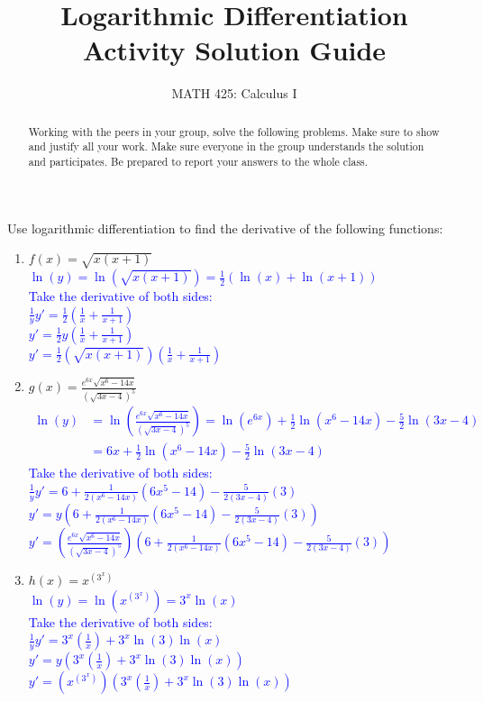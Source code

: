 \documentclass{ximera}
\title{Logarithmic Differentiation Activity Solution Guide}
\author{MATH 425: Calculus I}
\begin{document}
\begin{abstract}
   Working with the peers in your group, solve the following problems. Make sure to show and justify all your work. Make sure everyone in the group understands the solution and participates. Be prepared to report your answers to the whole class. 
\end{abstract}
\maketitle


\begin{exercise}
    Use logarithmic differentiation to find the derivative of the following functions: 
    
    \begin{enumerate}
        \item $\displaystyle f(x)=\sqrt{x(x+1)}$\\
    \textcolor{blue}{ $\ln(y)=\ln(\sqrt{x(x+1)})=\frac12\left(\ln(x)+\ln(x+1)\right)$\\
    Take the derivative of both sides:\\
    $\frac{1}{y}y'=\frac12\left(\frac{1}{x}+\frac{1}{x+1}\right)$\\
    $y'=\frac12 y\left(\frac{1}{x}+\frac{1}{x+1}\right)$\\
    $y'=\frac12 \left(\sqrt{x(x+1)}\right)\left(\frac{1}{x}+\frac{1}{x+1}\right)$}
    
    \item $\displaystyle g(x)=\frac{e^{6x}\sqrt{x^6-14x}}{(\sqrt{3x-4})^5}$\\
    \textcolor{blue}{ \begin{align}
        \ln(y)&=\ln\left(\frac{e^{6x}\sqrt{x^6-14x}}{(\sqrt{3x-4})^5}\right)=\ln(e^{6x})+\frac12\ln(x^6-14x)-\frac52\ln(3x-4)\nonumber\\
        &=6x+\frac12\ln(x^6-14x)-\frac52\ln(3x-4)\nonumber
    \end{align}
    Take the derivative of both sides: \\
    $\frac{1}{y}y'=6+\frac{1}{2(x^6-14x)}(6x^5-14)-\frac{5}{2(3x-4)}(3)$\\
    $y'=y\left(6+\frac{1}{2(x^6-14x)}(6x^5-14)-\frac{5}{2(3x-4)}(3)\right)$\\
    $y'=\left(\frac{e^{6x}\sqrt{x^6-14x}}{(\sqrt{3x-4})^5}\right)\left(6+\frac{1}{2(x^6-14x)}(6x^5-14)-\frac{5}{2(3x-4)}(3)\right)$}
    
    \item $\displaystyle h(x)=x^{(3^x)}$\\
    \textcolor{blue}{ $\ln(y)=\ln(x^{(3^x)})=3^x\ln(x)$\\
    Take the derivative of both sides: \\
    $\frac1{y}y'=3^x\left(\frac1x\right)+3^x\ln(3)\ln(x)$\\
    $y'=y\left(3^x\left(\frac1x\right)+3^x\ln(3)\ln(x)\right)$\\
    $y'=\left(x^{(3^x)}\right)\left(3^x\left(\frac1x\right)+3^x\ln(3)\ln(x)\right)$\\}
    

\end{enumerate}
\end{exercise}
\end{document}
